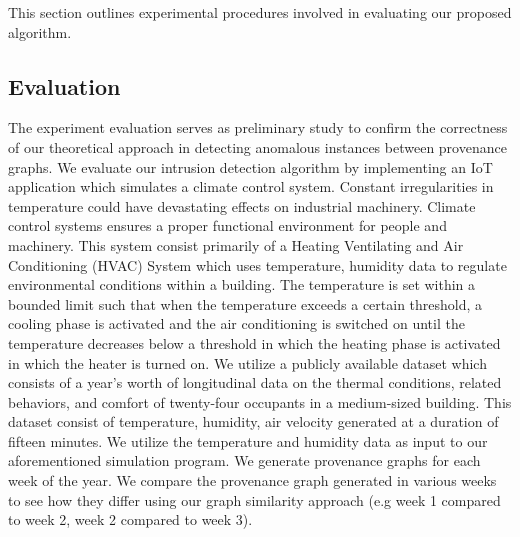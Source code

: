 This section outlines experimental procedures involved in evaluating our proposed algorithm. 



\subsection{ Evaluation}
The experiment evaluation serves as preliminary study to confirm the correctness of our theoretical approach in detecting anomalous instances between provenance graphs. We evaluate our intrusion detection algorithm by implementing an IoT application which simulates a climate control system. Constant irregularities in temperature could have devastating effects on industrial machinery. Climate control systems ensures a proper functional environment for people and machinery. This system consist primarily of a Heating Ventilating and Air Conditioning (HVAC) System which uses temperature, humidity data to regulate environmental conditions within a building. The temperature is set within a bounded limit such that when the temperature exceeds a certain threshold, a cooling phase is activated and the air conditioning is switched on until the temperature decreases below a threshold in which the heating phase is activated in which the heater is turned on. We utilize a publicly available dataset \cite{LANGEVIN201594} which consists of a year's worth of longitudinal data on the thermal conditions, related behaviors, and comfort of twenty-four occupants in a medium-sized building. This dataset consist of temperature, humidity, air velocity generated at  a duration of fifteen minutes. We utilize the temperature and humidity data as input to our aforementioned simulation program. We generate provenance graphs for each week of the year. We compare the provenance graph generated in various weeks to see how they differ using our graph similarity approach (e.g week 1 compared to week 2, week 2 compared to week 3). 











